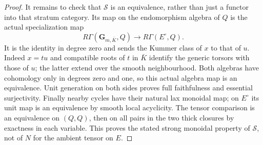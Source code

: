 \documentclass[11pt]{article}
\theoremstyle{definition}
\theoremstyle{remark}
\begin{document}
\begin{proof}
It remains to check that $\mathcal S$ is an equivalence, rather than
just a functor into that stratum category.  Its map on the endomorphism
algebra of $Q$ is the actual specialization map
\[
 R\Gamma(\mathbf G_{m,\bar K},Q)\longrightarrow
 R\Gamma(E^\circ,Q).
\]
It is the identity in degree zero and sends the Kummer class of $x$
to that of $u$.  Indeed $x=tu$ and compatible roots of $t$ in $\bar K$
identify the generic torsors with those of $u$; the latter extend over
the smooth neighbourhood.  Both algebras have cohomology only in
degrees zero and one, so this actual algebra map is an equivalence.
Unit generation on both sides proves full faithfulness and essential
surjectivity.  Finally nearby cycles have their natural lax monoidal
map; on $E^\circ$ its unit map is an equivalence by smooth local
acyclicity.  The tensor comparison is an equivalence on $(Q,Q)$,
then on all pairs in the two thick closures by exactness in each
variable.  This proves the stated strong monoidal property of
$\mathcal S$, not of $N$ for the ambient tensor on $E$.
\end{proof}
\end{document}
